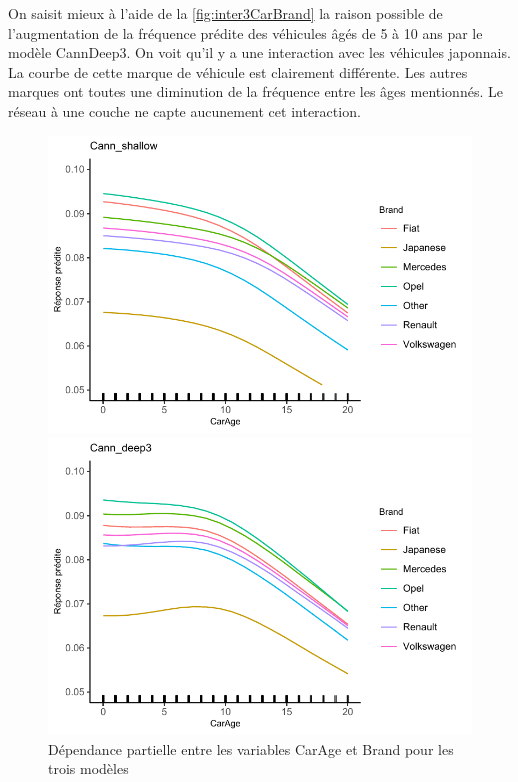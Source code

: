 On saisit mieux à l'aide de la \autoref{fig:inter3CarBrand} la raison possible de l'augmentation de la fréquence prédite des véhicules âgés de 5 à 10 ans par le modèle CannDeep3. On voit qu'il y a une interaction avec les véhicules japonnais. La courbe de cette marque de véhicule est clairement différente. Les autres marques ont toutes une diminution de la fréquence entre les âges mentionnés. Le réseau à une couche ne capte aucunement cet interaction. 

\begin{figure}
\caption{\label{fig:inter3CarBrand} Dépendance partielle entre les variables CarAge et Brand pour les trois modèles}
\centering
\begin{minipage}{0.45\linewidth}
\includegraphics[scale=0.6]{Graphiques/interBrandCarShallow}
\end{minipage}
\hfill
\begin{minipage}{0.45\linewidth}
\includegraphics[scale=0.6]{Graphiques/interCarBrandCann}

\end{minipage}
\end{figure}
